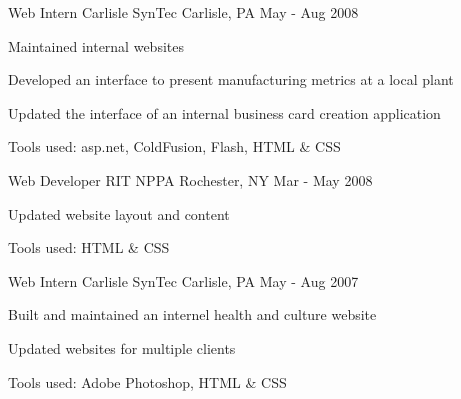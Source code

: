\begin{cventries}
  \cventry
    {Web Intern}
    {Carlisle SynTec}
    {Carlisle, PA}
    {May - Aug 2008}
    {
      \begin{cvitems}
        \item {Maintained internal websites}
        \item {Developed an interface to present manufacturing metrics at a local plant}
        \item {Updated the interface of an internal business card creation application}
        \item {Tools used: asp.net, ColdFusion, Flash, HTML \& CSS}
      \end{cvitems}
    }

  \cventry
    {Web Developer}
    {RIT NPPA}
    {Rochester, NY}
    {Mar - May 2008}
    {
      \begin{cvitems}
        \item {Updated website layout and content}
        \item {Tools used: HTML \& CSS}
      \end{cvitems}
    }

  \cventry
    {Web Intern}
    {Carlisle SynTec}
    {Carlisle, PA}
    {May - Aug 2007}
    {
      \begin{cvitems}
        \item {Built and maintained an internel health and culture website}
        \item {Updated websites for multiple clients}
        \item {Tools used: Adobe Photoshop, HTML \& CSS}
      \end{cvitems}
    }
\end{cventries}
